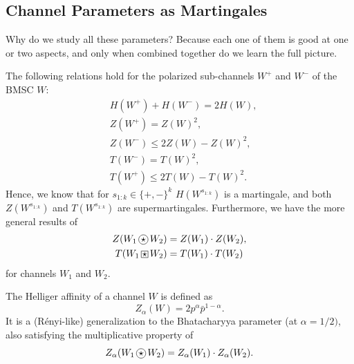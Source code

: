 \subsection{Channel Parameters as Martingales} 
Why do we study all these parameters? Because each one of them is good at one or two aspects, and only when combined together do we learn the full picture.
\begin{theorem} \label{thm:w5_channel_param_martingale}
    The following relations hold for the polarized sub-channels $W^+$ and $W^-$ of the BMSC $W$:
    \begin{align}
        &H(W^+) + H(W^-) = 2H(W),\\
        &Z(W^+) = Z(W)^2,\\
        &Z(W^-) \le 2Z(W) - Z(W)^2,\\
        &T(W^-) = T(W)^2,\\
        &T(W^+) \le 2T(W) - T(W)^2.
    \end{align}
    Hence, we know that for $s_{1:k}\in\{+,-\}^k$ $H(W^{s_{1:k}})$ is a martingale, and both $Z(W^{s_{1:k}})$ and $T(W^{s_{1:k}})$ are supermartingales. Furthermore, we have the more general results of
    \begin{align}
        Z(W_1\ostar W_2) &= Z(W_1)\cdot Z(W_2), \\
        T(W_1\boxstar W_2) &= T(W_1)\cdot T(W_2)
    \end{align}
    for channels $W_1$ and $W_2$.
\end{theorem}

\begin{remark}
    The Helliger affinity of a channel $W$ is defined as
    \begin{equation}
        Z_\alpha(W) = 2p^\alpha \bar{p}^{1-\alpha}.
    \end{equation}
    It is a (R\'enyi-like) generalization to the Bhatacharyya parameter (at $\alpha=1/2)$, also satisfying the multiplicative property of
    \begin{equation}
        Z_\alpha(W_1\ostar W_2) = Z_\alpha(W_1)\cdot Z_\alpha(W_2).
    \end{equation}
\end{remark}

